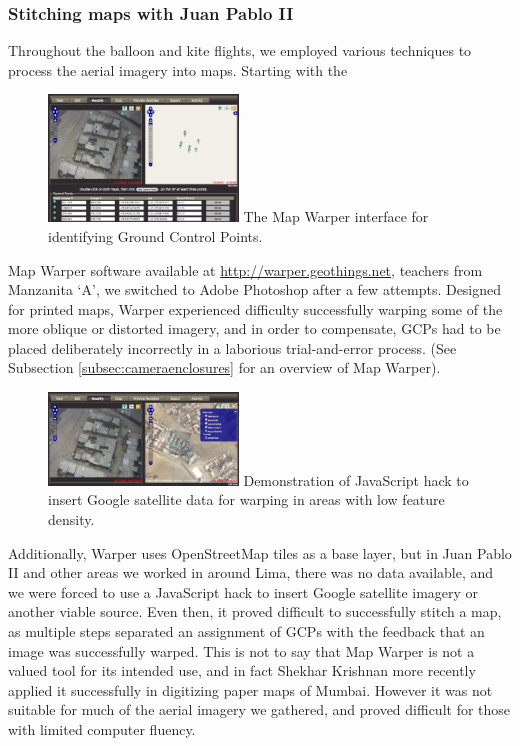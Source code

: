 \documentclass[11pt]{report}
\begin{document}
\subsubsection{Stitching maps with Juan Pablo II}

Throughout the balloon and kite flights, we employed various techniques to process the aerial imagery into maps. Starting with the \begin{figure}
	\begin{flushright}
		\includegraphics[width=0.45\textwidth]{images/map-warper.png}
		The Map Warper interface for identifying Ground Control Points. \cite{waters2009warper}
	\end{flushright}
\end{figure} Map Warper software available at \url{http://warper.geothings.net}, teachers from Manzanita `A', we switched to Adobe Photoshop after a few attempts. Designed for printed maps, Warper experienced difficulty successfully warping some of the more oblique or distorted imagery, and in order to compensate, GCPs had to be placed deliberately incorrectly in a laborious trial-and-error process. (See Subsection \ref{subsec:cameraenclosures} for an overview of Map Warper). \begin{figure}
	\begin{flushright}
		\includegraphics[width=0.45\textwidth]{images/map-warper-hack.png}
		Demonstration of JavaScript hack to insert Google satellite data for warping in areas with low feature density. \cite{waters2009warper}
	\end{flushright}
\end{figure}Additionally, Warper uses OpenStreetMap tiles as a base layer, but in Juan Pablo II and other areas we worked in around Lima, there was no data available, and we were forced to use a JavaScript hack to insert Google satellite imagery or another viable source. Even then, it proved difficult to successfully stitch a map, as multiple steps separated an assignment of GCPs with the feedback that an image was successfully warped. This is not to say that Map Warper is not a valued tool for its intended use, and in fact Shekhar Krishnan more recently applied it successfully in digitizing paper maps of Mumbai. However it was not suitable for much of the aerial imagery we gathered, and proved difficult for those with limited computer fluency.
\end{document}
